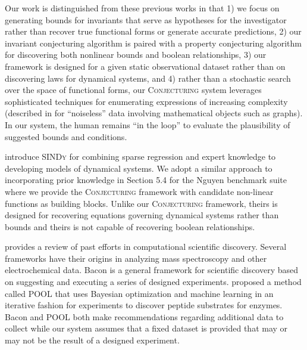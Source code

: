\documentclass[ijds,nonblindrev]{informs-ijds}
\begin{document}
Our work is distinguished from these previous works in that 1) we focus on generating bounds for invariants that serve as hypotheses for the investigator rather than recover true functional forms or generate accurate predictions, 2) our invariant conjecturing algorithm is paired with a property conjecturing algorithm for discovering both nonlinear bounds and boolean relationships, 3) our framework is designed for a given static observational dataset rather than on discovering laws for dynamical systems, and 4) rather than a stochastic search over the space of functional forms, our \textsc{Conjecturing} system leverages sophisticated techniques for enumerating expressions of increasing complexity  (described in \citet{LarsVanc16} for ``noiseless'' data involving mathematical objects such as graphs).  In our system, the human remains ``in the loop'' to evaluate the plausibility of suggested bounds and conditions.

\citet{brunton} introduce \textsc{SINDy} for combining sparse regression and expert knowledge to developing models of dynamical systems.  We adopt a similar approach to incorporating prior knowledge in Section 5.4 for the Nguyen benchmark suite \citep{nguyen} where we provide the \textsc{Conjecturing} framework with candidate non-linear functions as building blocks.  Unlike our \textsc{Conjecturing} framework, theirs is designed for recovering equations governing dynamical systems rather than bounds and theirs is not capable of recovering boolean relationships.

\cite{Langley19}  provides a review of past efforts in computational scientific discovery.  Several frameworks have their origins in analyzing mass spectroscopy and other electrochemical data.  Bacon \citep{LangEtal87} is a general framework for scientific discovery based on suggesting and executing a series of designed experiments.  \cite{Tallorin18} proposed a method called POOL that uses Bayesian optimization and machine learning in an iterative fashion for experiments to discover peptide substrates for enzymes. Bacon and POOL both make recommendations regarding additional data to collect while our system assumes that a fixed dataset is provided that may or may not be the result of a designed experiment.




\end{document}
